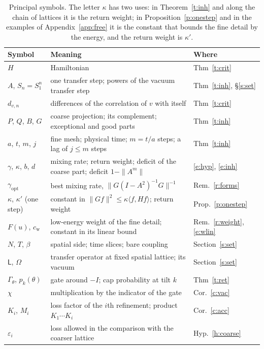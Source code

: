 \begin{table}[htbp]
\caption{Principal symbols. The letter $\kappa$ has two uses: in Theorem~\ref{t:inh} and along the chain of
lattices it is the return weight; in Proposition~\ref{p:onestep} and in the examples of
Appendix~\ref{app:free} it is the constant that bounds the fine detail by the energy, and the return weight
is $\kappa'$.}\label{tab:sym}
\centering\small
\begin{tabular}{@{}l>{\raggedright\arraybackslash}p{}l@{}}
\toprule
Symbol & Meaning & Where \\
\midrule
$H$ & Hamiltonian & Thm~\ref{t:crit} \\
$A$, $S_n=S_1^n$ & one transfer step; powers of the vacuum transfer step & Thm~\ref{t:inh}, \S\ref{s:set} \\
$d_{v,n}$ & differences of the correlation of $v$ with itself & Thm~\ref{t:crit} \\
$P$, $Q$, $B$, $G$ & coarse projection; its complement; exceptional and good parts & Thm~\ref{t:inh} \\
$a$, $t$, $m$, $j$ & fine mesh; physical time; $m=t/a$ steps; a lag of $j\le m$ steps & Thm~\ref{t:inh} \\
$\gamma$, $\kappa$, $b$, $d$ & mixing rate; return weight; deficit of the coarse part; deficit $1-\|A^m\|$ & \eqref{e:hyp}, \eqref{e:inh} \\
$\gamma_{\mathrm{opt}}$ & best mixing rate, $\|G(I-A^2)^{-1}G\|^{-1}$ & Rem.~\ref{r:forms} \\
$\kappa$, $\kappa'$ (one step) & constant in $\|Gf\|^2\le\kappa\langle f,Hf\rangle$; return weight & Prop.~\ref{p:onestep} \\
$F(u)$, $c_{\mathrm w}$ & low-energy weight of the fine detail; constant in its linear bound & Rem.~\ref{r:weight}, \eqref{e:wlin} \\
$N$, $T$, $\beta$ & spatial side; time slices; bare coupling & Section~\ref{s:set} \\
$\mathsf L$, $\Omega$ & transfer operator at fixed spatial lattice; its vacuum & Section~\ref{s:set} \\
$\Gamma_\theta$, $p_k(\theta)$ & gate around $-I$; cap probability at tilt $k$ & Thm~\ref{t:ret} \\
$\chi$ & multiplication by the indicator of the gate & Cor.~\ref{c:vac} \\
$K_i$, $M_i$ & loss factor of the $i$th refinement; product $K_1\cdots K_i$ & Cor.~\ref{c:acc} \\
$\varepsilon_i$ & loss allowed in the comparison with the coarser lattice & Hyp.~\ref{h:coarse} \\

\end{tabular}
\end{table}
